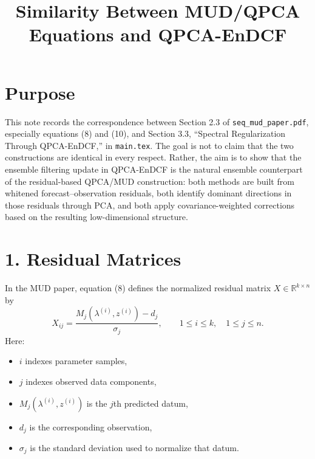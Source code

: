 \documentclass[11pt]{article}
\title{Similarity Between MUD/QPCA Equations and QPCA-EnDCF}
\author{}
\date{}
\begin{document}
\maketitle

\section*{Purpose}

This note records the correspondence between Section 2.3 of \texttt{seq\_mud\_paper.pdf}, especially equations (8) and (10), and Section 3.3, ``Spectral Regularization Through QPCA-EnDCF,'' in \texttt{main.tex}. The goal is not to claim that the two constructions are identical in every respect. Rather, the aim is to show that the ensemble filtering update in QPCA-EnDCF is the natural ensemble counterpart of the residual-based QPCA/MUD construction: both methods are built from whitened forecast--observation residuals, both identify dominant directions in those residuals through PCA, and both apply covariance-weighted corrections based on the resulting low-dimensional structure.

\section*{1. Residual Matrices}

In the MUD paper, equation (8) defines the normalized residual matrix $X \in \mathbb{R}^{k \times n}$ by
\begin{equation}
X_{ij}
=
\frac{M_j(\lambda^{(i)}, z^{(i)}) - d_j}{\sigma_j},
\qquad 1 \le i \le k,\quad 1 \le j \le n.
\label{eq:mud_eq8_note}
\end{equation}
Here:
\begin{itemize}
\item $i$ indexes parameter samples,
\item $j$ indexes observed data components,
\item $M_j(\lambda^{(i)}, z^{(i)})$ is the $j$th predicted datum,
\item $d_j$ is the corresponding observation,
\item $\sigma_j$ is the standard deviation used to normalize that datum.
\end{itemize}
\end{document}
